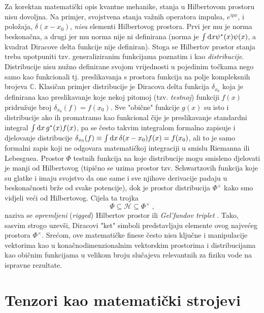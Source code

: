 Za korektan matematički opis kvantne mehanike, stanja u Hilbertovom
prostoru nisu dovoljna. Na primjer, svojstvena stanja važnih operatora
impulsa, $e^{i p x}$, i položaja, $\delta(x - x_0)$, \emph{nisu} elementi
Hilbertovog prostora. Prvi jer mu je norma beskonačna, a drugi jer mu
norma nije ni definirana (norma je $\int \textrm{d} x \psi^{*}(x) \psi(x)$,
a kvadrat Diracove delta funkcije nije definiran).
Stoga se Hilbertov prostor stanja treba upotpuniti tzv. generaliziranim
funkcijama poznatim i kao \emph{distribucije}. Distribucije nisu nužno
definirane svojom vrijednosti u pojedinim točkama nego samo kao funkcionali
tj. preslikavanja s prostora funkcija na polje kompleksnih brojeva $\mathbb{C}$.
Klasičan primjer distribucije je Diracova delta funkcija $\delta_{x_0}$ koja je definirana
kao preslikavanje koje nekoj pitomoj (tzv. \emph{testnoj}) funkciji $f(x)$
pridružuje broj $\delta_{x_0}(f) = f(x_0)$. Sve "obične" funkcije $g(x)$ su isto
i distribucije ako ih promatramo kao funkcional čije je preslikavanje 
standardni integral  $\int \textrm{d} x\, g^{*}(x) f(x)$,
pa se često takvim integralom formalno zapisuje i djelovanje distribucije
$\delta_{x_0}(f) \equiv \int \textrm{d} x\, \delta(x-x_0) f(x) = f(x_0)$, ali to je samo formalni zapis
koji ne odgovara matematičkoj integraciji u smislu Riemanna ili Lebesguea.
Prostor $\Phi$ testnih funkcija  na koje distribucije mogu smisleno djelovati je
manji od Hilbertovog (tipično se uzima prostor tzv. Schwartzovih funkcija koje su glatke
i imaju svojstvo da one same i sve njihove derivacije padaju u beskonačnosti brže od svake potencije),
dok je prostor
distribucija $\Phi^{\times}$ kako smo vidjeli veći od Hilbertovog.
Cijela ta trojka
\begin{equation}
    \Phi \subseteq \mathcal{H} \subseteq \Phi^{\times} \;,
    \label{eq:gelfand}
\end{equation}
naziva se \emph{opremljeni} (\emph{rigged}) Hilbertov prostor  ili
\emph{Gel'fandov triplet} \cite{Ballentine:1998}. Tako, sasvim strogo uzevši, Diracovi
"ket" simboli predstavljaju elemente ovog najvećeg prostora $\Phi^{\times}$.
Srećom, ove matematičke finese često nisu ključne i
manipulacije vektorima kao u konačnodimenzionalnim vektorskim prostorima i distribucijama
kao običnim funkcijama u velikom broju slučajeva relevantnih
za fiziku vode na ispravne rezultate.



\chapter{Tenzori kao matematički strojevi}
\label{sec:tenzorKaoStroj}

